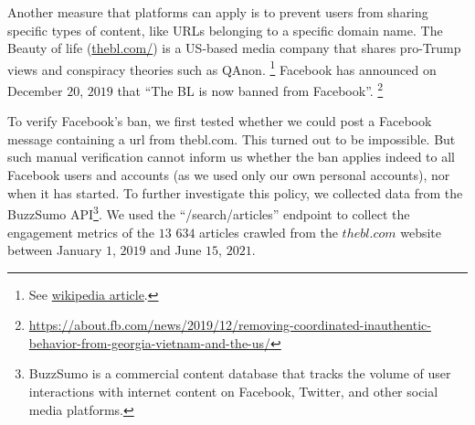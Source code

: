 \documentclass{article}
\begin{document}
Another measure that platforms can apply is to prevent users from sharing specific types of content, like URLs belonging to a specific domain name.  
The Beauty of life (\href{https://thebl.com/}{thebl.com/}) is a US-based media company that shares pro-Trump views and conspiracy theories such as QAnon.
\footnote{ See \href{https://en.wikipedia.org/wiki/The\_Epoch\_Times\#Removal\_of\_The\_BL\_(The\_Beauty\_of\_Life)\_from\_Facebook}{wikipedia article}.} 
Facebook has announced on December $20$, $2019$ that ``The BL is now banned from Facebook''.
\footnote{\url{https://about.fb.com/news/2019/12/removing-coordinated-inauthentic-behavior-from-georgia-vietnam-and-the-us/}}

To verify Facebook’s ban, we first tested whether we could post a Facebook message containing a url from thebl.com. This turned out to be impossible. But such manual verification cannot inform us whether the ban applies indeed to all Facebook users and accounts (as we used only our own personal accounts), nor when it has started. To further investigate this policy, we collected data from the BuzzSumo API\footnote{BuzzSumo is a commercial content database that tracks the volume of user interactions with internet content on Facebook, Twitter, and other social media platforms.}. We used the ``/search/articles'' endpoint to collect the engagement metrics of the $13$ $634$ articles crawled from the $thebl.com$ website between January $1$, $2019$ and June $15$, $2021$.
\end{document}
